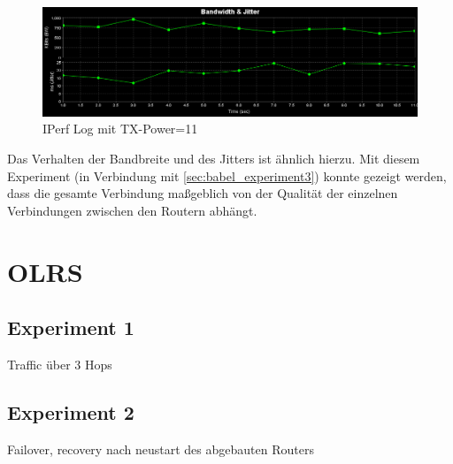 \documentclass[10pt]{scrartcl}
\begin{document}
	\begin{figure}
        \centering
                \includegraphics[width=\textwidth]{img/4_UDP_Babel_TX1_10MB}
        \caption{IPerf Log mit TX-Power=11}
        \label{img:babel_iperf_graph_tx11}
	\end{figure}
	
Das Verhalten der Bandbreite und des Jitters ist ähnlich hierzu.
Mit diesem Experiment (in Verbindung mit \ref{sec:babel_experiment3}) konnte gezeigt werden, dass die gesamte Verbindung maßgeblich von der Qualität der einzelnen Verbindungen zwischen den Routern abhängt.

\section{OLRS}
	\subsection{Experiment 1}
	Traffic über 3 Hops	
	
	\subsection{Experiment 2}
	Failover, recovery nach neustart des abgebauten Routers


\end{document}
